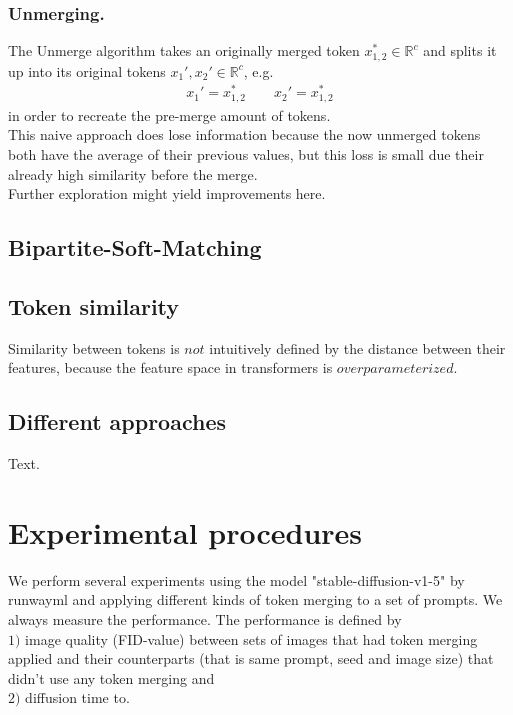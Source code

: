 \documentclass{article}
\begin{document}
\subsubsection*{Unmerging.} The Unmerge algorithm takes an originally merged token $x_{1,2}^* \in \mathbb{R}^c$ and splits it up into its original tokens $x_1', x_2' \in \mathbb{R}^c$, e.g. 
\begin{align*}
    x_1' = x_{1,2}^* \quad\quad
    x_2' = x_{1,2}^*
\end{align*}
in order to recreate the pre-merge amount of tokens.\\
This naive approach does lose information because the now unmerged tokens both have the average of their previous values, but this loss is small due their already high similarity before the merge.\\ Further exploration might yield improvements here.

\subsection{Bipartite-Soft-Matching}


\subsection{Token similarity}
Similarity between tokens is \(not\) intuitively defined by the distance between their features, because the feature space in transformers is  \(overparameterized\).\\

\subsection{Different approaches}
Text.





\newpage
\section{Experimental procedures}
We perform several experiments using the model "stable-diffusion-v1-5" by runwayml\cite{Rombach_2022_CVPR} and applying different kinds of token merging to a set of prompts. We always measure the performance.
The performance is defined by\\ 
\(1)\) image quality (FID-value) between sets of images that had token merging applied and their counterparts (that is same prompt, seed and image size) that didn't use any token merging and\\
\(2)\) diffusion time to.
\end{document}

